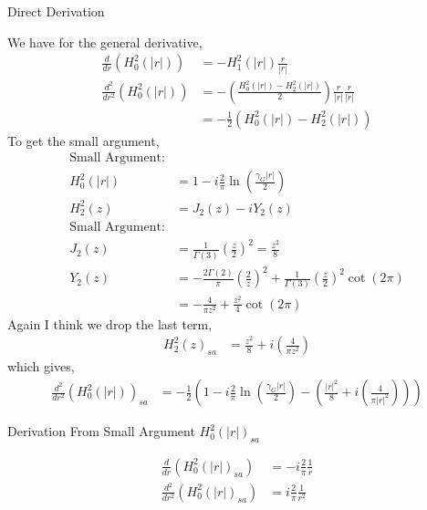 \documentclass{article}
\newcommand{\0}{\varnothing}
\begin{document}
\begin{minipage}[t]{0.5\textwidth}
{\centering Direct Derivation\ \\}

We have for the general derivative,
\begin{align*}
	\frac{d}{dr} \left(H_0^2(|r|)\right) &= -H_1^2(|r|) \frac{r}{|r|}\\
	\frac{d^2}{dr^2} \left(H_0^2(|r|)\right) &= -\left(\frac{H_0^2(|r|) - H_2^2 (|r|)}{2} \right) \frac{r}{|r|} \frac{r}{|r|}\\
							   &=-\frac{1}{2}\left(H_0^2(|r|) - H_2^2(|r|) \right)
\end{align*}
To get the small argument, 
\begin{align*}
\text{Small Argument:}&\\
	H_0^2(|r|) & = 1 - i \frac{2}{\pi} \ln \left( \frac{\gamma_G |r|}{2} \right)\\
	H_2^2(z) &= J_2(z) - i Y_2(z) \\
	\text{Small Argument:}& \\
	J_2(z) &= \frac{1}{\Gamma(3)} (\frac{z}{2})^2 = \frac{z^2}{8}\\
 	Y_2(z) &= -\frac{2\Gamma(2)}{\pi} \left(\frac{2}{z}\right)^2 + \frac{1}{\Gamma(3)} \left(\frac{z}{2}\right)^2 \cot(2\pi) \\
 		   &= -\frac{4}{\pi z^2} + \frac{z^2}{4} \cot(2\pi)
\end{align*}
Again I think we drop the last term,
\begin{align*}
 	H_2^2(z)_{sa} &=  \frac{z^2}{8} + i \left( \frac{4}{\pi z^2} \right) 
\end{align*}
which gives,
\begin{align*}
	\frac{d^2}{dr^2} \left( H_0^2(|r|) \right)_{sa} &= -\frac{1}{2} \left( 1 - i \frac{2}{\pi} \ln \left( \frac{\gamma_G |r|}{2} \right) - \left( \frac{|r|^2}{8} + i \left( \frac{4}{\pi |r|^2} \right) \right) \right)
\end{align*}
\end{minipage}
\begin{minipage}[t]{0.5\textwidth}
{\centering Derivation From Small Argument $H_0^2(|r|)_{sa}$\ \\}

\begin{align*}
\frac{d}{dr}\left(H_0^2(|r|)_{sa}\right) & =  - i \frac{2}{\pi} \frac{1}{r} \\
\frac{d^2}{dr^2}\left(H_0^2 (|r|)_{sa}\right) & =  i \frac{2}{\pi} \frac{1}{r^2} \\
\end{align*}

\end{minipage}
\end{document}
